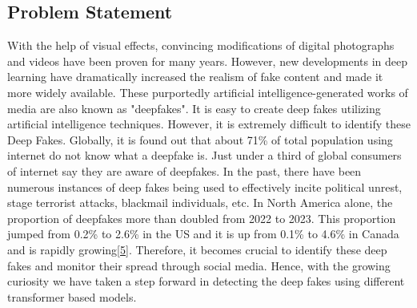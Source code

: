 \subsection{Problem Statement}
With the help of visual effects, convincing modifications of digital photographs and videos have been proven for many years. However, new developments in deep learning have dramatically increased the realism of fake content and made it more widely available. These purportedly artificial intelligence-generated works of media are also known as "deepfakes". It is easy to create deep fakes utilizing artificial intelligence techniques. However, it is extremely difficult to identify these Deep Fakes.
Globally, it is found out that about 71\% of total population using internet do not know what a deepfake is. Just under a third of global consumers of internet say they are aware of deepfakes. In the past, there have been numerous instances of deep fakes being used to effectively incite political unrest, stage terrorist attacks, blackmail individuals, etc.
In North America alone, the proportion of deepfakes more than doubled from 2022 to 2023. This proportion jumped from 0.2\% to 2.6\% in the US and it is up from 0.1\% to 4.6\% in Canada and is rapidly growing\hyperref[ref5]{[5]}. Therefore, it becomes crucial to identify these deep fakes and monitor their spread through social media. Hence, with the growing curiosity we have taken a step forward in detecting the deep fakes using different transformer based models.